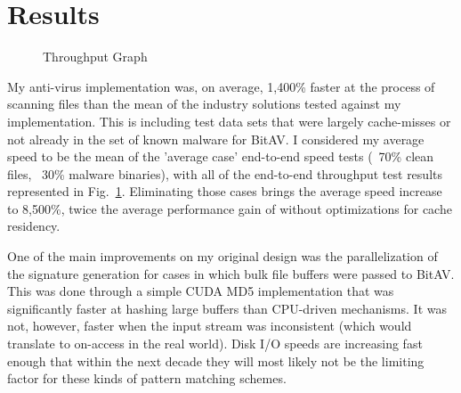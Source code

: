 \documentclass[12pt,journal]{IEEEtran}
\begin{document}
\section{Results}
\begin{figure}[!t]
\centering
\hspace*{-1.5cm} 
\caption{Throughput Graph}
\label{graph_through}
\end{figure}

My anti-virus implementation was, on average, 1,400\% faster at the process of scanning files than the mean of the industry solutions tested against my implementation. This is including test data sets that were largely cache-misses or not already in the set of known malware for BitAV. I considered my average speed to be the mean of the 'average case' end-to-end speed tests (~70\% clean files, ~30\% malware binaries), with all of the end-to-end throughput test results represented in Fig.~\ref{graph_through}. Eliminating those cases brings the average speed increase to 8,500\%, twice the average performance gain of \cite{Erdogan2005} without optimizations for cache residency.\par

One of the main improvements on my original design was the parallelization of the signature generation for cases in which bulk file buffers were passed to BitAV. This was done through a simple CUDA MD5 implementation that was significantly faster at hashing large buffers than CPU-driven mechanisms. It was not, however, faster when the input stream was inconsistent (which would translate to on-access in the real world). Disk I/O speeds are increasing fast enough that within the next decade they will most likely not be the limiting factor for these kinds of pattern matching schemes.\par
\end{document}
